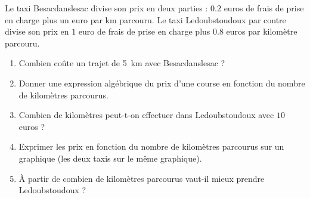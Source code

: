
    Le taxi Besacdanslesac divise son prix en deux parties : $0.2$ euros de frais de prise en charge plus un euro par km parcouru. Le taxi Ledoubstoudoux par contre divise son prix en $1$ euro de frais de prise en charge plus $0.8$ euros par kilomètre parcouru.

    \begin{enumerate}
        \item
            Combien coûte un trajet de \SI{5}{\kilo\meter} avec Besacdanslesac ?
        \item
            Donner une expression algébrique du prix d'une course en fonction du nombre de kilomètres parcourus.
        \item
            Combien de kilomètres peut-t-on effectuer dans Ledoubstoudoux avec \( 10\) euros ?
        \item
            Exprimer les prix en fonction du nombre de kilomètres parcourus sur un graphique (les deux taxis sur le même graphique).
        \item
            À partir de combien de kilomètres parcourus vaut-il mieux prendre Ledoubstoudoux ?
    \end{enumerate}

